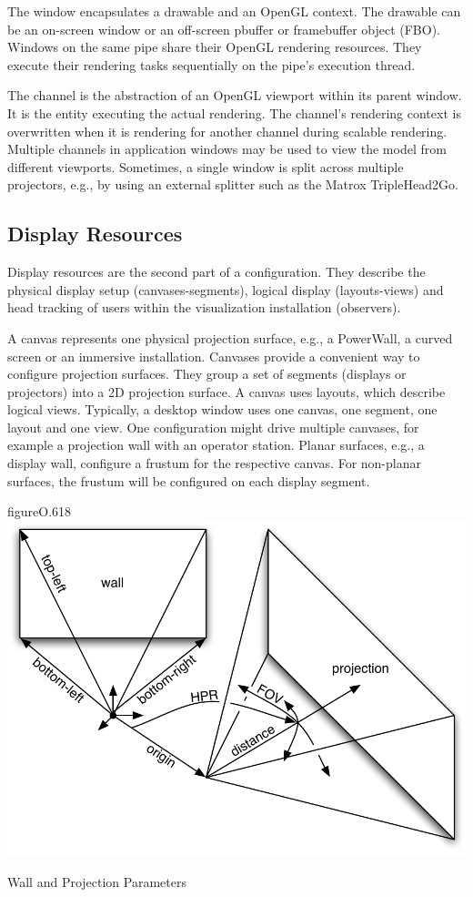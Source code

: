 The \textsf{window} encapsulates a drawable and an OpenGL context. The drawable
can be an on-screen window or an off-screen pbuffer or framebuffer object (FBO).
Windows on the same pipe share their OpenGL rendering resources. They execute
their rendering tasks sequentially on the pipe's execution thread.

The \textsf{channel} is the abstraction of an OpenGL viewport within its parent
window. It is the entity executing the actual rendering. The channel's
rendering context is overwritten when it is rendering for another channel
during scalable rendering. Multiple channels in application windows may be used
to view the model from different viewports. Sometimes, a single window is split
across multiple projectors, e.g., by using an external splitter such as the
Matrox TripleHead2Go.


\subsection{Display Resources}

Display resources are the second part of a configuration. They describe the
physical display setup (canvases-segments), logical display (layouts-views) and
head tracking of users within the visualization installation (observers).

A \textsf{canvas} represents one physical projection surface, e.g., a
PowerWall, a curved screen or an immersive installation. Canvases provide a
convenient way to configure projection surfaces. They group a set of segments
(displays or projectors) into a 2D projection surface. A canvas uses layouts,
which describe logical views. Typically, a desktop window uses one canvas, one
segment, one layout and one view. One configuration might drive multiple
canvases, for example a projection wall with an operator station. Planar
surfaces, e.g., a display wall, configure a frustum for the respective canvas.
For non-planar surfaces, the frustum will be configured on each display
segment.

\begin{wrapfloat}{figure}{O}{.618\textwidth}
 \includegraphics[width=.618\textwidth]{images/frusta.pdf}
 {\caption{\label{fFrusta}Wall and Projection Parameters}}
\end{wrapfloat}

